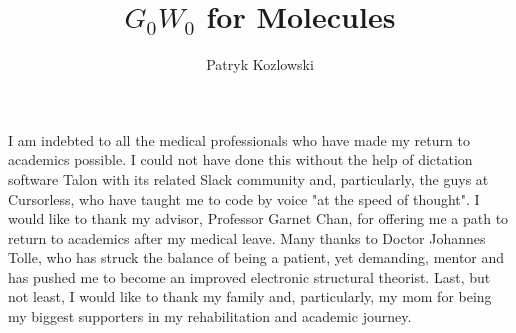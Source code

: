 \documentclass[12pt]{caltech_thesis}
\begin{document}
\title{$G_0W_0$ for Molecules}
\author{Patryk Kozlowski}

\address{Pasadena, California}                     %



\maketitle[logo]

\begin{acknowledgements} 	 

   I am indebted to all the medical professionals who have made my return to academics possible. I could not have done this without the help of dictation software Talon with its related Slack community and, particularly, the guys at Cursorless, who have taught me to code by voice "at the speed of thought". I would like to thank my advisor, Professor Garnet Chan, for offering me a path to return to academics after my medical leave. Many thanks to Doctor Johannes Tolle, who has struck the balance of being a patient, yet demanding, mentor and has pushed me to become an improved electronic structural theorist. Last, but not least, I would like to thank my family and, particularly, my mom for being my biggest supporters in my rehabilitation and academic journey.
\end{acknowledgements}



\end{document}
